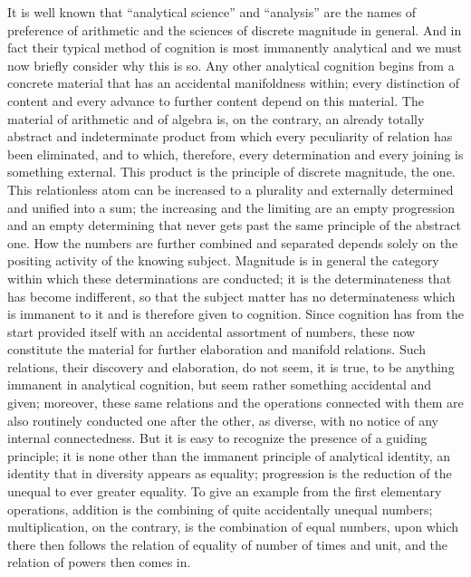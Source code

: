It is well known that “analytical science” and “analysis”
are the names of preference of arithmetic
and the sciences of discrete magnitude in general.
And in fact their typical method of cognition is
most immanently analytical
and we must now briefly consider why this is so.
Any other analytical cognition
begins from a concrete material
that has an accidental manifoldness within;
every distinction of content and every advance to
further content depend on this material.
The material of arithmetic and of algebra is, on the contrary,
an already totally abstract and indeterminate product
from which every peculiarity of relation has been eliminated,
and to which, therefore, every determination
and every joining is something external.
This product is the principle of discrete magnitude, the one.
This relationless atom can be increased to
a plurality and externally determined
and unified into a sum;
the increasing and the limiting are
an empty progression and an empty determining
that never gets past the same principle
of the abstract one.
How the numbers are further combined and separated
depends solely on the positing activity of the knowing subject.
Magnitude is in general the category
within which these determinations are conducted;
it is the determinateness that has become indifferent,
so that the subject matter has no
determinateness which is immanent to it
and is therefore given to cognition.
Since cognition has from the start provided itself with
an accidental assortment of numbers,
these now constitute the material
for further elaboration and manifold relations.
Such relations, their discovery and elaboration,
do not seem, it is true, to be anything immanent
in analytical cognition,
but seem rather something accidental and given;
moreover, these same relations
and the operations connected with them
are also routinely conducted one after the other,
as diverse, with no notice of any internal connectedness.
But it is easy to recognize
the presence of a guiding principle;
it is none other than the immanent
principle of analytical identity,
an identity that in diversity appears as equality;
progression is the reduction of
the unequal to ever greater equality.
To give an example from the first elementary operations,
addition is the combining of quite accidentally unequal numbers;
multiplication, on the contrary, is the combination of equal numbers,
upon which there then follows the relation of
equality of number of times and unit,
and the relation of powers then comes in.

